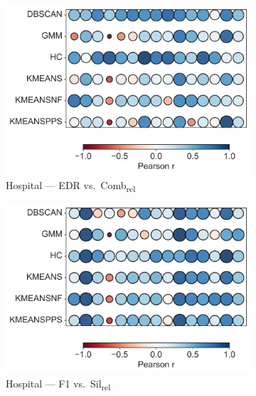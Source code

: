 \documentclass[10pt]{article} %
\numberwithin{equation}{section}
\begin{document}
\begin{figure}[htbp]
  \begin{subfigure}[b]{0.33\linewidth}
    \includegraphics[width=\linewidth]{figures/6.4.3graph/HO_EDR_vs_Comb_relative.pdf}
    \caption{Hospital — EDR vs.\ Comb\textsubscript{rel}}
    \label{fig:ho_edr_comb}
  \end{subfigure}\hfill
  \begin{subfigure}[b]{0.33\linewidth}
    \includegraphics[width=\linewidth]{figures/6.4.3graph/HO_F1_vs_Sil_relative.pdf}
    \caption{Hospital — F1 vs.\ Sil\textsubscript{rel}}
    \label{fig:ho_f1_sil}
  \end{subfigure}\hfill
  \begin{subfigure}[b]{0.33\linewidth}

\end{subfigure}
\end{figure}
\end{document}
